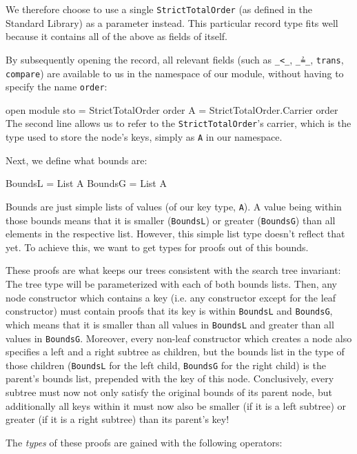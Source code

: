 \documentclass{scrartcl}
\newenvironment{code}{\verbatim}{\endverbatim}
\begin{document}
We therefore choose to use a single \verb/StrictTotalOrder/ (as
defined in the Standard Library) as a parameter instead. This
particular record type fits well because it contains
all of the above as fields of itself.

By subsequently opening the record, all relevant fields (such as
\verb/_<_/, \verb/_≟_/, \verb/trans/, \verb/compare/) are available to
us in the namespace of our module, without having to specify the name
\verb/order/:

\nopagebreak
\begin{code}
open module sto = StrictTotalOrder order
A = StrictTotalOrder.Carrier order
\end{code}
The second line allows us to refer to the \verb/StrictTotalOrder/'s
carrier, which is the type used to store the node's keys, simply as
\verb/A/ in our namespace.

Next, we define what bounds are:

\begin{code}
BoundsL = List A
BoundsG = List A
\end{code}

Bounds are just simple lists of values (of our key type, \verb/A/). A
value being within those bounds means that it is smaller
(\verb/BoundsL/) or greater (\verb/BoundsG/) than all elements in the
respective list. However, this simple list type doesn't reflect that yet. To
achieve this, we want to get types for proofs out of this bounds.

These proofs are what keeps our trees consistent with the search tree
invariant: The tree type will be parameterized with each of both
bounds lists. Then, any node constructor which contains a key
(i.e. any constructor except for the leaf constructor) must contain
proofs that its key is within \verb/BoundsL/ and \verb/BoundsG/, which
means that it is smaller than all values in \verb/BoundsL/ and greater
than all values in \verb/BoundsG/. Moreover, every non-leaf
constructor which creates a node also specifies a left and a right
subtree as children, but the bounds list in the type of those children
(\verb/BoundsL/ for the left child, \verb/BoundsG/ for the right
child) is the parent's bounds list, prepended with the key of this
node. Conclusively, every subtree must now not only satisfy the
original bounds of its parent node, but additionally all keys within
it must now also be smaller (if it is a left subtree) or greater (if
it is a right subtree) than its parent's key!

The \emph{types} of these proofs are gained with the following operators:
\end{document}
